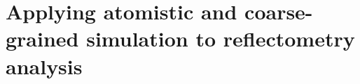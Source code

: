 
\chapter{Applying atomistic and coarse-grained simulation to reflectometry analysis} %

\label{reflectometry2} %




\pagebreak






\renewcommand\bibsection{\section{\refname}}


